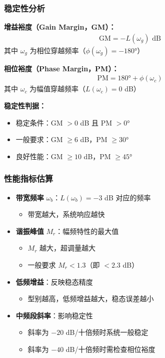 \subsubsection{稳定性分析}
\textbf{增益裕度（Gain Margin，GM）：}
\begin{align*}
\text{GM} = -L(\omega_g) \text{ dB}
\end{align*}
其中 $\omega_g$ 为相位穿越频率（$\phi(\omega_g) = -180°$）

\textbf{相位裕度（Phase Margin，PM）：}
\begin{align*}
\text{PM} = 180° + \phi(\omega_c)
\end{align*}
其中 $\omega_c$ 为幅值穿越频率（$L(\omega_c) = 0$ dB）

\textbf{稳定性判据：}
\begin{itemize}
    \item 稳定条件：GM $> 0$ dB 且 PM $> 0°$
    \item 一般要求：GM $\geq 6$ dB，PM $\geq 30°$
    \item 良好性能：GM $\geq 10$ dB，PM $\geq 45°$
\end{itemize}

\subsubsection{性能指标估算}
\begin{itemize}
    \item \textbf{带宽频率} $\omega_b$：$L(\omega_b) = -3$ dB 对应的频率
    \begin{itemize}
        \item 带宽越大，系统响应越快
    \end{itemize}
    \item \textbf{谐振峰值} $M_r$：幅频特性的最大值
    \begin{itemize}
        \item $M_r$ 越大，超调量越大
        \item 一般要求 $M_r < 1.3$（即 $< 2.3$ dB）
    \end{itemize}
    \item \textbf{低频增益}：反映稳态精度
    \begin{itemize}
        \item 型别越高，低频增益越大，稳态误差越小
    \end{itemize}
    \item \textbf{中频段斜率}：影响稳定性
    \begin{itemize}
        \item 斜率为 $-20$ dB/十倍频时系统一般稳定
        \item 斜率为 $-40$ dB/十倍频时需检查相位裕度
    \end{itemize}
\end{itemize}
